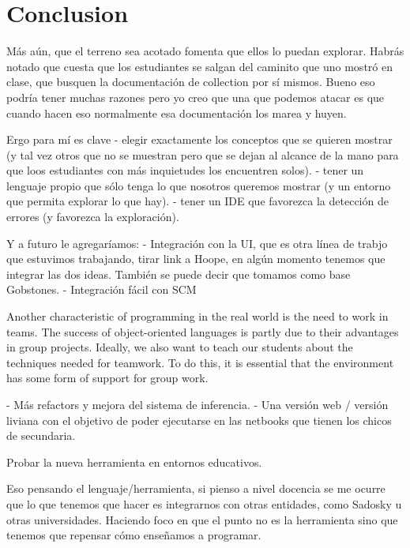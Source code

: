 \section{Conclusion}
\label{sec:conclusion}


Más aún, que el terreno sea acotado fomenta que ellos lo puedan explorar. 
Habrás notado que cuesta que los estudiantes se salgan del caminito que uno mostró en clase, que busquen la documentación de collection por sí mismos. Bueno eso podría tener muchas razones pero yo creo que una que podemos atacar es que cuando hacen eso normalmente esa documentación los marea y huyen.

Ergo para mí es clave 
- elegir exactamente los conceptos que se quieren mostrar (y tal vez otros que no se muestran pero que se dejan al alcance de la mano para que loos estudiantes con más inquietudes los encuentren solos).
- tener un lenguaje propio que sólo tenga lo que nosotros queremos mostrar (y un entorno que permita explorar lo que hay).
- tener un IDE que favorezca la detección de errores (y favorezca la exploración).


Y a futuro le agregaríamos:
- Integración con la UI, que es otra línea de trabjo que estuvimos trabajando, tirar link a Hoope, en algún momento tenemos que integrar las dos ideas. También se puede decir que tomamos como base Gobstones.
- Integración fácil con SCM

Another characteristic of programming in the real world is the need to work in
teams. The success of object-oriented languages is partly due to their advantages in
group projects. Ideally, we also want to teach our students about the techniques
needed for teamwork. To do this, it is essential that the environment has some form
of support for group work. \cite{kolling_problem_1999}

- Más refactors y mejora del sistema de inferencia.
- Una versión web / versión liviana con el objetivo de poder ejecutarse en las netbooks que tienen los chicos de secundaria.

Probar la nueva herramienta en entornos educativos.

Eso pensando el lenguaje/herramienta, si pienso a nivel docencia se me ocurre que lo que tenemos que hacer es integrarnos con otras entidades, como Sadosky u otras universidades.
Haciendo foco en que el punto no es la herramienta sino que tenemos que repensar cómo enseñamos a programar.
